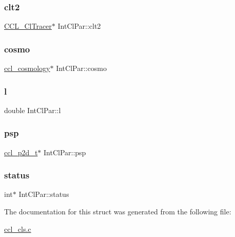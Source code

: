 \subsubsection{\texorpdfstring{clt2}{clt2}}
{\footnotesize\ttfamily \mbox{\hyperlink{struct_c_c_l___cl_tracer}{C\+C\+L\+\_\+\+Cl\+Tracer}}$\ast$ Int\+Cl\+Par\+::clt2}

\mbox{\label{struct_int_cl_par_a23ea5c0ad9cf5813be51906bfe326c7d}} 
\subsubsection{\texorpdfstring{cosmo}{cosmo}}
{\footnotesize\ttfamily \mbox{\hyperlink{structccl__cosmology}{ccl\+\_\+cosmology}}$\ast$ Int\+Cl\+Par\+::cosmo}

\mbox{\label{struct_int_cl_par_a588f97b773d94c73dc312e564566069d}} 
\subsubsection{\texorpdfstring{l}{l}}
{\footnotesize\ttfamily double Int\+Cl\+Par\+::l}

\mbox{\label{struct_int_cl_par_a6fd01be704421f0c26ad9030cf798f1a}} 
\subsubsection{\texorpdfstring{psp}{psp}}
{\footnotesize\ttfamily \mbox{\hyperlink{structccl__p2d__t}{ccl\+\_\+p2d\+\_\+t}}$\ast$ Int\+Cl\+Par\+::psp}

\mbox{\label{struct_int_cl_par_abc2ccba43ee24664930d4471badeba83}} 
\subsubsection{\texorpdfstring{status}{status}}
{\footnotesize\ttfamily int$\ast$ Int\+Cl\+Par\+::status}



The documentation for this struct was generated from the following file\+:\begin{DoxyCompactItemize}
\item 
\mbox{\hyperlink{ccl__cls_8c}{ccl\+\_\+cls.\+c}}\end{DoxyCompactItemize}
